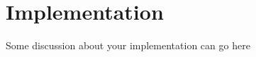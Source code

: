 \section{Implementation}
\label{sec:Implementation}
Some discussion about your implementation can go here
